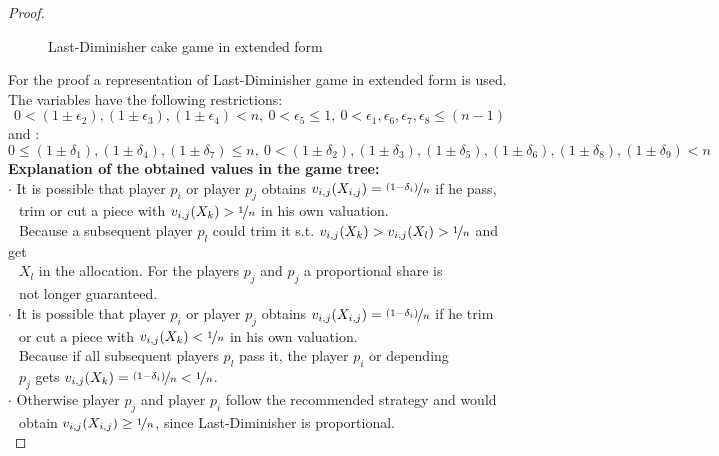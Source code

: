 \begin{proof}
\begin{figure}[h!]
\begin{center}
\begin{tikzpicture}
	\end{tikzpicture}
	\caption{Last-Diminisher cake game in extended form}\label{ldef}
\end{center}
\end{figure}
\newpage
For the proof a representation of Last-Diminisher game in extended form is used. The variables have the following restrictions: $$ 0 < (1\pm\epsilon_2),(1\pm\epsilon_3),(1\pm\epsilon_4) <n,\: 0 < \epsilon_5 \leq 1,\:0 < \epsilon_1,\epsilon_6,\epsilon_7,\epsilon_8 \leq (n-1)$$ and :$$ 0 \leq (1\pm\delta_1),(1\pm\delta_4),(1\pm\delta_7) \leq n,\:0< (1\pm\delta_2),(1\pm\delta_3),(1\pm\delta_5),(1\pm\delta_6),(1\pm\delta_8),(1\pm\delta_9) < n$$
\newline
\textbf{Explanation of the obtained values in the game tree:}\\
\newline
$\cdot$ It is possible that player $p_i$ or player $p_j$ obtains $v_{i,j}(X_{i,j})=\nicefrac{(1-\delta_i)}{n}$ if he pass,\\\textcolor{white}{la}\textcolor{black}{}trim or cut a piece with $v_{i,j}(X_k)>\nicefrac{1}{n}$ in his own valuation.\\\textcolor{white}{la}\textcolor{black}{}Because a subsequent player $p_l$ could trim it s.t. $v_{i,j}(X_k)>v_{i,j}(X_l)>\nicefrac{1}{n}$ and get\\\textcolor{white}{la}\textcolor{black}{}$X_l$ in the allocation. For the players $p_j$ and $p_j$ a proportional share is\\\textcolor{white}{la}\textcolor{black}{}not longer guaranteed.\\ 
$\cdot$ It is possible that player $p_i$ or player $p_j$ obtains $v_{i,j}(X_{i,j})=\nicefrac{(1-\delta_i)}{n}$ if he trim\\\textcolor{white}{la}\textcolor{black}{}or cut a piece with $v_{i,j}(X_k)<\nicefrac{1}{n}$ in his own valuation.\\\textcolor{white}{la}\textcolor{black}{}Because if all subsequent players $p_l$ pass it, the player $p_i$ or depending \\\textcolor{white}{la}\textcolor{black}{}$p_j$ gets $v_{i,j}(X_k)=\nicefrac{(1-\delta_i)}{n}<\nicefrac{1}{n}$.\\
$\cdot$ Otherwise player $p_j$ and player $p_i$ follow the recommended strategy and would\\\textcolor{white}{la}\textcolor{black}{}obtain $v_{i,j}(X_{i,j}) \geq \nicefrac{1}{n}$, since Last-Diminisher is proportional.\\
\newline

\end{proof}

